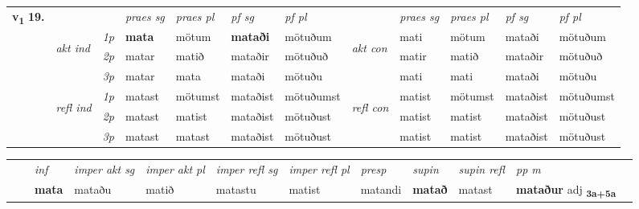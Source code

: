 \begin{tabular}{llllllllllll} \toprule
\multirow{4}{*}{{{\textbf{v{\textsubscript{1}}} \Large{\textbf{19.}}}}}  & &   &  \textit{praes sg}  & \textit{praes pl}  &\textit{ pf sg} & \textit{pf pl} &  &  \textit{praes sg}  & \textit{praes pl}  & \textit{pf sg} & \textit{pf pl } \\*
	\cmidrule{4-7} \cmidrule{9-12}
 & \multirow{3}{*}{\begin{turn}{90}\textit{akt ind}\end{turn}} & {\textit{1p}} & \textbf{mata} & mötum    & \textbf{mataði} & mötuðum & \multirow{3}{*}{\begin{turn}{90}\textit{akt con}\end{turn}} &mati & mötum & mataði & mötuðum\\*
& &  {\textit{2p}} &  matar  & matið   & mataðir & mötuðuð & & matir & matið & mataðir & mötuðuð \\*
& &  {\textit{3p}} & matar & mata   & mataði & mötuðu & & mati & mati& mataði & mötuðu  \\*
\cmidrule{4-7} \cmidrule{9-12}
 &\multirow{3}{*}{\begin{turn}{90}\textit{refl ind}\end{turn}} & {\textit{1p}} & matast & mötumst    & mataðist & mötuðumst & \multirow{3}{*}{\begin{turn}{90}\textit{refl con}\end{turn}}  &matist & mötumst & mataðist & mötuðumst\\*
 &&  {\textit{2p}} &  matast  & matist   & mataðist & mötuðust & &matist & matist & mataðist & mötuðust \\*
& &  {\textit{3p}} & matast & matast   & mataðist & mötuðust & & matist & matist& mataðist & mötuðust  \\*
\cmidrule{4-7} \cmidrule{9-12}
\end{tabular}


\begin{tabular}{llllllllllll}
 & & \textit{inf} & \textit{imper akt sg} & \textit{imper akt pl} & \textit{imper refl sg} & \textit{imper refl pl} & \textit{presp} & \textit{supin} & \textit{supin refl} & \textit{pp m}     \\*
  & & \textbf{mata} & mataðu  & matið & matastu & matist & matandi &  \textbf{matað} & matast & \textbf{mataður} adj \textbf{\textsubscript{3a+5a}} \\*
\cmidrule{1-12}
\end{tabular}



